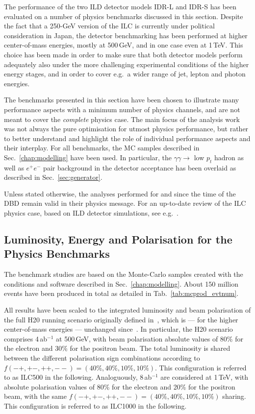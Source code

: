 

The performance of the two ILD detector models IDR-L and IDR-S has been
evaluated on a number of physics benchmarks discussed in this section. 
Despite the fact that a 250-GeV version of the ILC is currently under political consideration in Japan, the detector benchmarking has been performed at higher center-of-mass energies, mostly at 500\,GeV, and in one case even at 1\,TeV. This choice has been made in order to make sure that both detector models perform adequately also under the more challenging experimental conditions of the higher energy stages, and in order to cover e.g.\ a wider range of jet, lepton and photon energies.

The benchmarks presented in this section have been chosen to illustrate many performance aspects with a minimum number of physics channels, and are not meant to cover the {\em complete} physics case. The main focus of the analysis work was not always the pure optimisation for utmost physics performance, but rather to better understand and highlight the role of individual performance aspects and their interplay. For all benchmarks, the MC samples described in Sec.~\ref{chap:modelling} have been used. In particular, the $\gamma\gamma \to $ low $p_t$ hadron as well as $e^+e^-$ pair background in the detector acceptance has been overlaid as described in Sec.~\ref{sec:generator}.

Unless stated otherwise, the analyses performed for and since the time of the DBD remain valid in their physics message. For an up-to-date review of the ILC physics case, based on ILD detector simulations, see e.g.~\cite{Bambade:2019fyw}.

\subsection{Luminosity, Energy and Polarisation for the Physics Benchmarks}
\label{sec:benchmarks:lep}
The benchmark studies are based on the Monte-Carlo samples created with the conditions and software described in Sec.~\ref{chap:modelling}. About 150 million events have been produced in total as detailed in Tab.~\ref{tab:mcprod_evtnum}. 

All results have been scaled to the integrated luminosity and beam polarisation of the full H20 running scenario originally defined in~\cite{Bambade:2019fyw}, which is --- for the higher center-of-mass energies --- unchanged since~\cite{Barklow:2015tja}. In particular, the H20 scenario comprises 4\,ab$^{-1}$ at 500\,GeV, with beam polarisation absolute values of 80\% for the electron and 30\% for the positron beam. The total luminosity is shared between the different polarisation sign combinations according to $f(-+,+-,++,--) = (40\%,40\%, 10\%, 10\%)$. This configuration is referred to as ILC500 in the following.
Analoguously, 8\,ab$^{-1}$ are considered at 1\,TeV, with absolute polarisation values of 80\% for the electron and 20\% for the positron beam, with the same $f(-+,+-,++,--) = (40\%,40\%, 10\%, 10\%)$ sharing.  This configuration is referred to as ILC1000 in the following.

